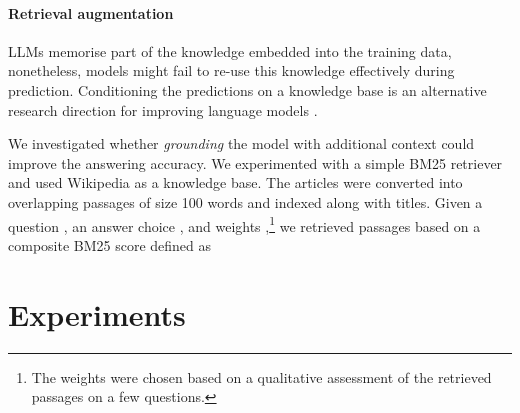 \documentclass{article} \usepackage{iclr2022_conference,times}
\newcommand{\bmtf}{{\footnotesize{BM25}} }
\begin{document}
\paragraph{Retrieval augmentation}

LLMs memorise part of the knowledge embedded into the training data, nonetheless, models might fail to re-use this knowledge effectively during prediction. Conditioning the predictions on a knowledge base is an alternative research direction for improving language models \citep{Lewis2020-cg, Borgeaud2021-td, Lazaridou2022-jj}. 

We investigated whether \textit{grounding} the model with additional context could improve the answering accuracy. We experimented with a simple \bmtf retriever and used Wikipedia as a knowledge base. The articles were converted into overlapping passages of size 100 words and indexed along with titles. Given a question , an answer choice , and weights ,\footnote{The weights were chosen based on a qualitative assessment of the retrieved passages on a few questions.} we retrieved passages  based on a composite \bmtf score defined as






\section{Experiments}
\end{document}
